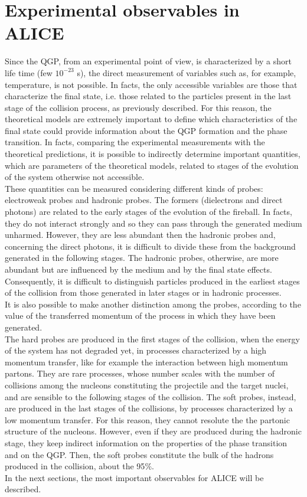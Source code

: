 \section{Experimental observables in ALICE}
Since the QGP, from an experimental point of view, is characterized by a short life time (few $10^{-23}$ s), the direct measurement of variables such as, for example, temperature, is not possible. In facts, the only accessible variables are those that characterize the final state, i.e. those related to the particles present in the last stage of the collision process, as previously described. For this reason, the theoretical models are extremely important to define which characteristics of the final state could provide information about the QGP formation and the phase transition. In facts, comparing the experimental measurements with the theoretical predictions, it is possible to indirectly determine important quantities, which are parameters of the theoretical models, related to stages of the evolution of the system otherwise not accessible.\\
These quantities can be measured considering different kinds of probes: electroweak probes and hadronic probes. The formers (dielectrons and direct photons) are related to the early stages of the evolution of the fireball. In facts, they do not interact strongly and so they can pass through the generated medium unharmed. However, they are less abundant then the hadronic probes and, concerning the direct photons, it is difficult to divide these from the background generated in the following stages. The hadronic probes, otherwise, are more abundant but are influenced by the medium and by the final state effects. Consequently, it is difficult to distinguish particles produced in the earliest stages of the collision from those generated in later stages or in hadronic processes.\\
It is also possible to make another distinction among the probes, according to the value of the transferred momentum of the process in which they have been generated.\\
The hard probes are produced in the first stages of the collision, when the energy of the system has not degraded yet, in processes characterized by a high momentum transfer, like for example the interaction between high momentum partons. They are rare processes, whose number scales with the number of collisions among the nucleons constituting the projectile and the target nuclei, and are sensible to the following stages of the collision. The soft probes, instead, are produced in the last stages of the collisions, by processes characterized by a low momentum transfer. For this reason, they cannot resolute the the partonic structure of the nucleons. However, even if they are produced during the hadronic stage, they keep indirect information on the properties of the phase transition and on the QGP. Then, the soft probes constitute the bulk of the hadrons produced in the collision, about the 95$\%$.\\
In the next sections, the most important observables for ALICE will be described.\\
